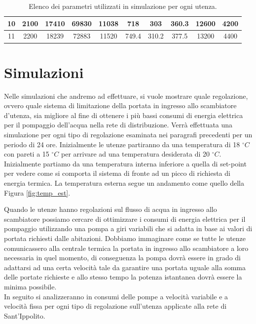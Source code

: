 \documentclass[laurea,oneside,11pt]{USiena_tesiLM}
\begin{document}
\begin{table}[!ht]
{\begin{tabular}{|c|c|c|c|c|c|c|c|c|c|}
10              & 2100                                     & 17410        & 69830        & 11038       & 718         & 303         & 360.3       & 12600       & 4200        \\ \hline
11              & 2200                                     & 18239        & 72883        & 11520       & 749.4       & 310.2       & 377.5       & 13200       & 4400        \\ \hline
\end{tabular}}
\caption{Elenco dei parametri utilizzati in simulazione per ogni utenza.}
\label{tab:par_utenze}
\end{table}

\section{Simulazioni}
Nelle simulazioni che andremo ad effettuare, si vuole mostrare quale regolazione, ovvero quale sistema di limitazione della portata in ingresso allo scambiatore d'utenza, sia migliore al fine di ottenere i più bassi consumi di energia elettrica per il pompaggio dell'acqua nella rete di distribuzione. Verrà effettuata una simulazione per ogni tipo di regolazione esaminata nei paragrafi precedenti per un periodo di 24 ore. Inizialmente le utenze partiranno da una temperatura di 18 $^{\circ}C$ con pareti a 15 $^{\circ}C$ per arrivare ad una temperatura desiderata di 20 $^{\circ}C$. Inizialmente partiamo da una temperatura interna inferiore a quella di set-point per vedere come si comporta il sistema di fronte ad un picco di richiesta di energia termica. La temperatura esterna segue un andamento come quello della Figura \ref{fig:temp_est}.

Quando le utenze hanno regolazioni sul flusso di acqua in ingresso allo scambiatore possiamo cercare di ottimizzare i consumi di energia elettrica per il pompaggio utilizzando una pompa a giri variabili che si adatta in base ai valori di portata richiesti dalle abitazioni. Dobbiamo immaginare come se tutte le utenze comunicassero alla centrale termica la portata in ingresso allo scambiatore a loro necessaria in quel momento, di conseguenza la pompa dovrà essere in grado di adattarsi ad una certa velocità tale da garantire una portata uguale alla somma delle portate richieste e allo stesso tempo la potenza istantanea dovrà essere la minima possibile.\\

In seguito si analizzeranno in consumi delle pompe a velocità variabile e a velocità fissa per ogni tipo di regolazione sull'utenza applicate alla rete di Sant'Ippolito. 
\end{document}
